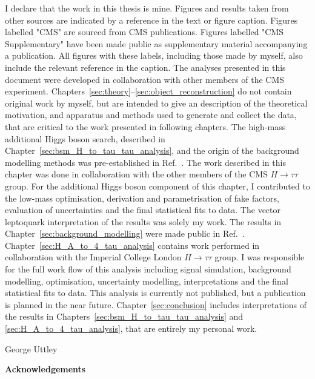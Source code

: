 \begin{titlepage}
\begin{adjustwidth}{1cm}{1cm}
I declare that the work in this thesis is mine. 
Figures and results taken from other sources are indicated by a reference in the text or figure caption. 
Figures labelled "CMS" are sourced from CMS publications. 
Figures labelled "CMS Supplementary" have been made public as supplementary material accompanying a publication. 
All figures with these labels, including those made by myself, also include the relevant reference in the caption.
The analyses presented in this document were developed in collaboration with other members of the CMS experiment. 
Chapters~\ref{sec:theory}--\ref{sec:object_reconstruction} do not contain original work by myself, but are intended to give an description of the theoretical motivation, and apparatus and methods used to generate and collect the data, that are critical to the work presented in following chapters. 
The high-mass additional Higgs boson search, described in Chapter~\ref{sec:bsm_H_to_tau_tau_analysis}, and the origin of the background modelling methods was pre-established in Ref.~\cite{CMS_MSSM_Tau_2018}.
The work described in this chapter was done in collaboration with the other members of the CMS $H\rightarrow\tau\tau$ group.
For the additional Higgs boson component of this chapter, I contributed to the low-mass optimisation, derivation and parametrisation of fake factors, evaluation of uncertainties and the final statistical fits to data.
The vector leptoquark interpretation of the results was solely my work.
The results in Chapter~\ref{sec:background_modelling} were made public in Ref.~\cite{CMS:2022rbd}.
Chapter~\ref{sec:H_A_to_4_tau_analysis} contains work performed in collaboration with the Imperial College London $H\rightarrow\tau\tau$ group.
I was responsible for the full work flow of this analysis including signal simulation, background modelling, optimisation, uncertainty modelling, interpretations and the final statistical fits to data.
This analysis is currently not published, but a publication is planned in the near future.
Chapter~\ref{sec:conclusion} includes interpretations of the results in Chapters~\ref{sec:bsm_H_to_tau_tau_analysis} and \ref{sec:H_A_to_4_tau_analysis}, that are entirely my personal work.

\begin{FlushRight}
George Uttley
\end{FlushRight}
\end{adjustwidth}
\vspace*{\fill}

\newpage


\vspace*{\fill}
\begin{adjustwidth}{1cm}{1cm}
\begin{center}
\Large \textbf{Acknowledgements}
\vspace{0.5cm}
\end{center}


\end{adjustwidth}
\end{titlepage}
